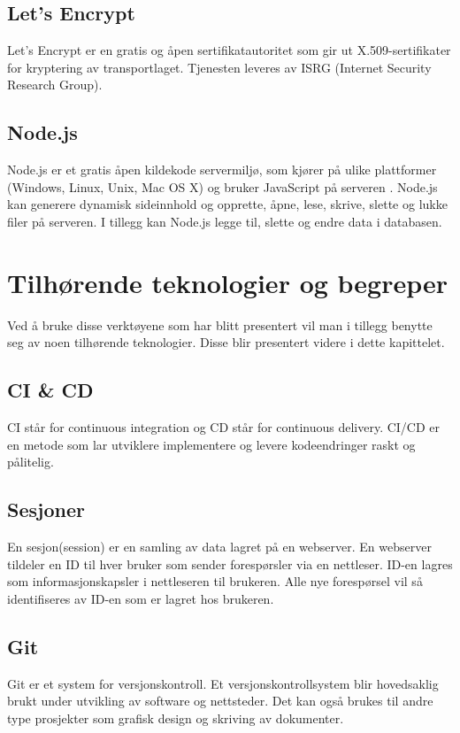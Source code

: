 \subsection{Let’s Encrypt}
Let’s Encrypt \cite{le2019ale} er en gratis og åpen sertifikatautoritet som gir ut X.509-sertifikater for kryptering av transportlaget. Tjenesten leveres av ISRG (Internet Security Research Group).

\subsection{Node.js}
Node.js er et gratis åpen kildekode servermiljø, som kjører på ulike plattformer (Windows, Linux, Unix, Mac OS X) og bruker JavaScript på serveren \cite{w3schools2019win}. Node.js kan generere dynamisk sideinnhold og opprette, åpne, lese, skrive, slette og lukke filer på serveren. I tillegg kan Node.js legge til, slette og endre data i databasen.

\section{Tilhørende teknologier og begreper}
Ved å bruke disse verktøyene som har blitt presentert vil man i tillegg benytte seg av noen tilhørende teknologier. Disse blir presentert videre i dette kapittelet.

\subsection{CI \& CD}
CI står for continuous integration og CD står for continuous delivery. CI/CD\cite{Pittet2019cd} er en metode som lar utviklere implementere og levere kodeendringer raskt og pålitelig.

\subsection{Sesjoner}
En sesjon\cite{progress2017ohs}(session) er en samling av data lagret på en webserver. En webserver tildeler en ID til hver bruker som sender forespørsler via en nettleser. ID-en lagres som informasjonskapsler i nettleseren til brukeren. Alle nye forespørsel vil så identifiseres av ID-en som er lagret hos brukeren.

\subsection{Git}
Git\cite{TechTarget} er et system for versjonskontroll. Et versjonskontrollsystem blir hovedsaklig brukt under utvikling av software og nettsteder. Det kan også brukes til andre type prosjekter som grafisk design og skriving av dokumenter.

